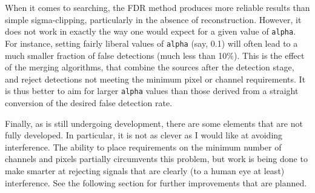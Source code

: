 When it comes to searching, the FDR method produces more reliable
results than simple sigma-clipping, particularly in the absence of
reconstruction.  However, it does not work in exactly the way one
would expect for a given value of \texttt{alpha}. For instance,
setting fairly liberal values of \texttt{alpha} (say, 0.1) will often
lead to a much smaller fraction of false detections (\ie much less
than 10\%). This is the effect of the merging algorithms, that combine
the sources after the detection stage, and reject detections not
meeting the minimum pixel or channel requirements.  It is thus better
to aim for larger \texttt{alpha} values than those derived from a
straight conversion of the desired false detection rate.

Finally, as \duchamp is still undergoing development, there are some
elements that are not fully developed. In particular, it is not as
clever as I would like at avoiding interference. The ability to place
requirements on the minimum number of channels and pixels partially
circumvents this problem, but work is being done to make \duchamp
smarter at rejecting signals that are clearly (to a human eye at
least) interference. See the following section for further
improvements that are planned.

